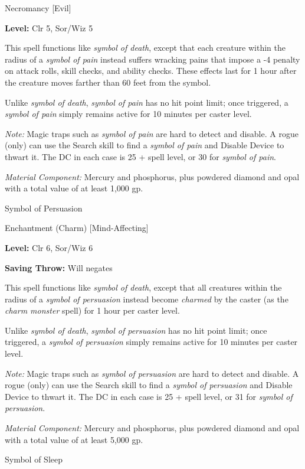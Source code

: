 \documentclass{article}
\begin{document}
Necromancy [Evil]

\textbf{Level:} Clr 5, Sor/Wiz 5

This spell functions like \textit{symbol of death}, except that each creature within 
the radius of a \textit{symbol of pain }instead suffers wracking pains that impose 
a -4 penalty on attack rolls, skill checks, and ability checks. These effects last 
for 1 hour after the creature moves farther than 60 feet from the symbol.

Unlike \textit{symbol of death}, \textit{symbol of pain }has no hit point limit; 
once triggered, a \textit{symbol of pain }simply remains active for 10 minutes 
per caster level.

\textit{Note: }Magic traps such as \textit{symbol of pain }are hard to detect and 
disable. A rogue (only) can use the Search skill to find a \textit{symbol of pain 
}and Disable Device to thwart it. The DC in each case is 25 + spell level, or 30 
for \textit{symbol of pain}.

\textit{Material Component: }Mercury and phosphorus, plus powdered diamond and 
opal with a total value of at least 1,000 gp.

\vspace{12pt}
Symbol of Persuasion

Enchantment (Charm) [Mind-Affecting]

\textbf{Level:} Clr 6, Sor/Wiz 6

\textbf{Saving Throw: }Will negates

This spell functions like \textit{symbol of death}, except that all creatures within 
the radius of a \textit{symbol of persuasion }instead become \textit{charmed }by 
the caster (as the \textit{charm monster }spell) for 1 hour per caster level.

Unlike \textit{symbol of death}, \textit{symbol of persuasion }has no hit point 
limit; once triggered, a \textit{symbol of persuasion }simply remains active for 
10 minutes per caster level.

\textit{Note: }Magic traps such as \textit{symbol of persuasion }are hard to detect 
and disable. A rogue (only) can use the Search skill to find a \textit{symbol of 
persuasion }and Disable Device to thwart it. The DC in each case is 25 + spell 
level, or 31 for \textit{symbol of persuasion}.

\textit{Material Component: }Mercury and phosphorus, plus powdered diamond and 
opal with a total value of at least 5,000 gp.

\vspace{12pt}
Symbol of Sleep
\end{document}
